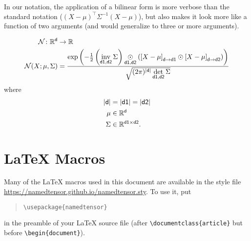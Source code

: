 \documentclass{article}
\newcommand{\reals}{\mathbb{R}}
\begin{document}
In our notation, the application of a bilinear form is more verbose than the standard notation ($(X-\mu)^\top \Sigma^{-1} (X-\mu)$), but also makes it look more like a function of two arguments (and would generalize to three or more arguments).

\begin{align*}
\mathcal{N} \colon \reals^{\name{d}} &\rightarrow \reals \\
\mathcal{N}(X; \mu, \Sigma) &= \frac{\exp\left(-\frac{1}{2} \left(\nfun{d1, d2}{inv} \Sigma\right) \ndot{d1,d2} \left(\nmov{d}{d1}{X - \mu} \odot \nmov{d}{d2}{X - \mu} \right) \right)}{\sqrt{(2 \pi)^{|\name{d}|} \nfun{d1, d2}{det} \Sigma}}
\end{align*}
where
\begin{align*}
|\name{d}| &= |\name{d1}| = |\name{d2}| \\
\mu &\in \reals^{\name{d}} \\
\Sigma & \in \reals^{\name{d1} \times \name{d2}}.
\end{align*}

\section{\LaTeX{} Macros}

Many of the \LaTeX{} macros used in this document are available in the style file \url{https://namedtensor.github.io/namedtensor.sty}. To use it, put
\begin{quote}
\begin{verbatim}
\usepackage{namedtensor}
\end{verbatim}
\end{quote}
in the preamble of your \LaTeX{} source file (after \verb|\documentclass{article}| but before \verb|\begin{document}|).
\end{document}

